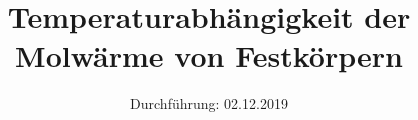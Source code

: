 
\usepackage{pgfplotstable}
\subject{V47}
\title{Temperaturabhängigkeit der \\ Molwärme von Festkörpern}
\date{%
  Durchführung: 02.12.2019
}



\maketitle
\thispagestyle{empty}
\tableofcontents
\newpage

\newpage

\newpage


\printbibliography{}

\newpage


